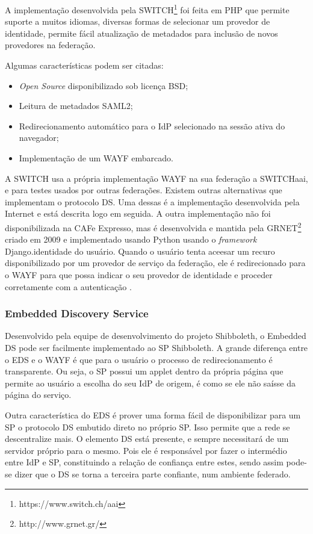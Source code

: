 A implementação desenvolvida pela SWITCH\footnote{https://www.switch.ch/aai} foi feita em PHP que permite suporte a muitos idiomas, diversas formas de selecionar um provedor de identidade, permite fácil atualização de metadados para inclusão de novos provedores na federação.

Algumas características podem ser citadas:
\begin{itemize}
  \item \textit{Open Source} disponibilizado sob licença BSD;
  \item Leitura de metadados SAML2;
  \item Redirecionamento automático para o IdP selecionado na sessão ativa do navegador;
  \item Implementação de um WAYF embarcado.
\end{itemize}


A SWITCH usa a própria implementação WAYF na sua federação a SWITCHaai, e para testes usados por outras federações. Existem outras alternativas que implementam o protocolo DS. Uma dessas é a implementação desenvolvida pela Internet e está descrita logo em seguida. A outra implementação não foi disponibilizada na CAFe Expresso, mas é desenvolvida e mantida pela GRNET\footnote{http://www.grnet.gr/} criado em 2009 e implementado usando Python usando o \textit{framework} Django.identidade do usuário. Quando o usuário tenta aceesar um recuro disponibilizado por um provedor de serviço da federação, ele é redirecionado para o WAYF para que possa indicar o seu provedor de identidade e proceder corretamente com a autenticação \cite{moreira:11}.

\subsubsection{Embedded Discovery Service}

Desenvolvido pela equipe de desenvolvimento do projeto Shibboleth, o Embedded DS pode ser facilmente implementado ao SP Shibboleth. A grande diferença entre o EDS e o WAYF é que para o usuário o processo de redirecionamento é transparente. Ou seja, o SP possui um applet dentro da própria página que permite ao usuário a escolha do seu IdP de origem, é como se ele não saísse da página do serviço.

Outra característica do EDS é prover uma forma fácil de disponibilizar para um SP o protocolo DS embutido direto no próprio SP. Isso permite que a rede se descentralize mais. O elemento DS está presente, e sempre necessitará de um servidor próprio para o mesmo. Pois ele é responsável por fazer o intermédio entre IdP e SP, constituindo a relação de confiança entre estes, sendo assim pode-se dizer que o DS se torna a terceira parte confiante, num ambiente federado.

